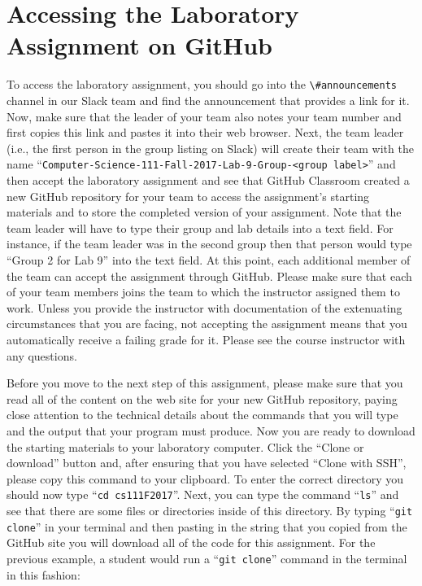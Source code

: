 \documentclass[11pt]{article}
\newcommand{\command}[1]{``\lstinline{#1}''}
\newcommand{\channel}[1]{\lstinline{#1}}
\begin{document}
\section*{Accessing the Laboratory Assignment on GitHub}

To access the laboratory assignment, you should go into the \channel{\#announcements} channel in our Slack team and find
the announcement that provides a link for it. Now, make sure that the leader of your team also notes your team number
and first copies this link and pastes it into their web browser. Next, the team leader (i.e., the first person in the
group listing on Slack) will create their team with the name \command{Computer-Science-111-Fall-2017-Lab-9-Group-<group
label>} and then accept the laboratory assignment and see that GitHub Classroom created a new GitHub repository for
your team to access the assignment's starting materials and to store the completed version of your assignment. Note that
the team leader will have to type their group and lab details into a text field. For instance, if the team leader was in
the second group then that person would type ``Group 2 for Lab 9'' into the text field. At this point, each additional
member of the team can accept the assignment through GitHub. Please make sure that each of your team members joins the
team to which the instructor assigned them to work. Unless you provide the instructor with documentation of the
extenuating circumstances that you are facing, not accepting the assignment means that you automatically receive a
failing grade for it. Please see the course instructor with any questions.

Before you move to the next step of this assignment, please make sure that you read all of the content on the web site
for your new GitHub repository, paying close attention to the technical details about the commands that you will type
and the output that your program must produce. Now you are ready to download the starting materials to your laboratory
computer. Click the ``Clone or download'' button and, after ensuring that you have selected ``Clone with SSH'', please
copy this command to your clipboard. To enter the correct directory you should now type \command{cd cs111F2017}. Next,
you can type the command \command{ls} and see that there are some files or directories inside of this directory. By
typing \command{git clone} in your terminal and then pasting in the string that you copied from the GitHub site you will
download all of the code for this assignment. For the previous example, a student would run a \command{git clone}
command in the terminal in this fashion:
\end{document}

